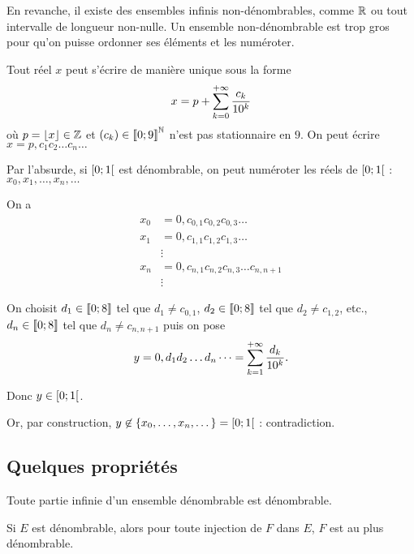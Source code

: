 \begin{dem}
\begin{itemize}
\begin{itemize}
    \end{itemize}
\end{itemize}
\end{dem}

En revanche, il existe des ensembles infinis non-dénombrables, comme \(\mathbb{R}\) ou tout intervalle de longueur non-nulle. Un ensemble non-dénombrable est trop gros pour qu'on puisse ordonner ses éléments et les numéroter.

\begin{dem}
Tout réel \(x\) peut s'écrire de manière unique sous la forme \[x=p+\sum_{k=0}^{+\infty}\dfrac{c_k}{10^k}\] où \(p=\left\lfloor x\right\rfloor\in\mathbb{Z}\) et \(\left(c_k\right)\in\left\llbracket0;9\right\rrbracket^{\mathbb{N}}\) n'est pas stationnaire en \(9\). On peut écrire \(x=p,c_1c_2\dots c_n\dots\)

Par l'absurde, si \(\left[0;1\right[\) est dénombrable, on peut numéroter les réels de \(\left[0;1\right[\) : \(x_0,x_1,\dots,x_n,\dots\)

On a \[\begin{aligned}
x_0&=0,c_{0,1}c_{0,2}c_{0,3}\dots \\
x_1&=0,c_{1,1}c_{1,2}c_{1,3}\dots \\
&\vdots \\
x_n&=0,c_{n,1}c_{n,2}c_{n,3}\dots c_{n,n+1} \\
&\vdots
\end{aligned}\]

On choisit \(d_1\in\left\llbracket0;8\right\rrbracket\) tel que \(d_1\not=c_{0,1}\), \(d_2\in\left\llbracket0;8\right\rrbracket\) tel que \(d_2\not=c_{1,2}\), etc., \(d_n\in\left\llbracket0;8\right\rrbracket\) tel que \(d_n\not=c_{n,n+1}\) puis on pose \[y=0,d_1d_2\dots d_n\dots=\sum_{k=1}^{+\infty}\dfrac{d_k}{10^k}.\]

Donc \(y\in\left[0;1\right[\).

Or, par construction, \(y\not\in\left\lbrace x_0,\dots,x_n,\dots\right\rbrace=\left[0;1\right[\) : contradiction.
\end{dem}

\subsection{Quelques propriétés}

\begin{prop}
Toute partie infinie d'un ensemble dénombrable est dénombrable.

Si \(E\) est dénombrable, alors pour toute injection de \(F\) dans \(E\), \(F\) est au plus dénombrable.
\end{prop}

